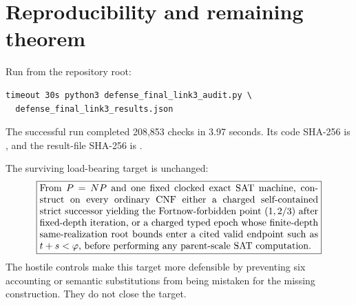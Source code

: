 \documentclass[11pt]{article}
\begin{document}
\section{Reproducibility and remaining theorem}

Run from the repository root:
\begin{verbatim}
timeout 30s python3 defense_final_link3_audit.py \
  defense_final_link3_results.json
\end{verbatim}
The successful run completed 208,853 checks in 3.97 seconds.  Its code
SHA-256 is
,
and the result-file SHA-256 is
.

The surviving load-bearing target is unchanged:
\[
 \boxed{\begin{minipage}{0.84\textwidth}
 From $P=NP$ and one fixed clocked exact SAT machine, construct on every
 ordinary CNF either a charged self-contained strict successor yielding the
 Fortnow-forbidden point $(1,2/3)$ after fixed-depth iteration, or a charged
 typed epoch whose finite-depth same-realization root bounds enter a cited
 valid endpoint such as $t+s<\varphi$, before performing any parent-scale SAT
 computation.
 \end{minipage}}
\]
The hostile controls make this target more defensible by preventing six
accounting or semantic substitutions from being mistaken for the missing
construction.  They do not close the target.




\end{document}
